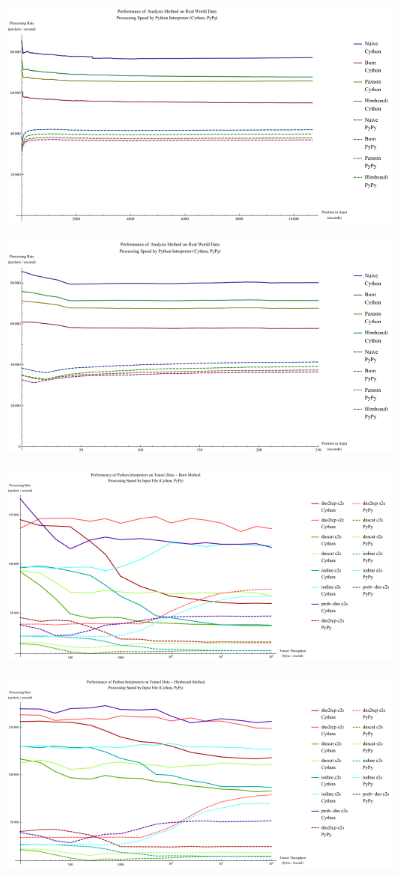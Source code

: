 \documentclass[12pt]{report}
\theoremstyle{remark}
\theoremstyle{definition}
\theoremstyle{definition}
\theoremstyle{definition}
\begin{document}
\begin{figure}
\centering
\includegraphics[width=4in]{figures/pmqr.pdf}
\end{figure}
\begin{figure}
\centering
\includegraphics[width=4in]{figures/pmqr-250.pdf}
\end{figure}
\begin{figure}
\centering
\includegraphics[width=4in]{figures/ppi-born.pdf}
\end{figure}
\begin{figure}
\centering
\includegraphics[width=4in]{figures/ppi-himbeault.pdf}
\end{figure}
\end{document}
